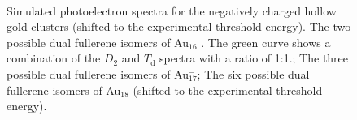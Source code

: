 \begin{figure}[htbp]
\begin{center}
    \hfill
    \\
\caption{Simulated photoelectron spectra for the negatively charged hollow gold
    clusters (shifted to the experimental threshold energy).
    \protect{} The two possible dual fullerene isomers of
    Au$_{16}^-$ . The green curve shows a combination of the $D_\mathrm{2}$ and
    $T_\mathrm{d}$ spectra with a ratio of 1:1.; \protect{}
    The three possible dual fullerene isomers of Au$_{17}^-$;
    \protect{} The six possible dual fullerene isomers of
    Au$_{18}^-$ (shifted to the experimental threshold energy).}
  \label{fig:photo_Au16}
\end{center}
\end{figure}

